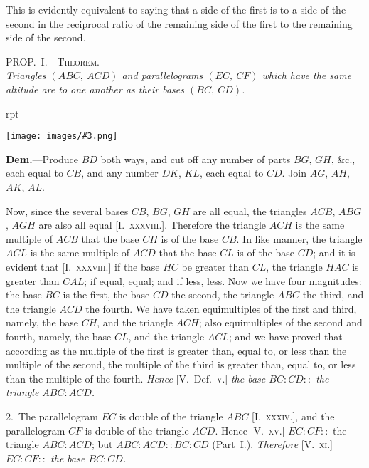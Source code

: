 \documentclass[oneside]{book}
\newcounter{wrapwidth}
\newcommand\myprop[2]{
\bigskip\Needspace*{4\baselineskip}\begin{center}\textsc{#1}\\\medskip\emph{#2}\par\end{center}
}
\newcommand\imgflow[3]{
\setcounter{wrapwidth}{#1}
\begin{wrapfigure}[#2]{r}{\value{wrapwidth}pt}
\begin{center}
\vspace{-0.3in}
\texttt{[image: images/\#3.png]}
\end{center}
\end{wrapfigure}
}
\begin{document}
\smallskip
\begin{footnotesize}
This is evidently equivalent to saying that a side of the first is
to a side of the second in the reciprocal ratio of the remaining
side of the first to the remaining side of the second.
\par\end{footnotesize}

\myprop{PROP\@.~I.---Theorem.}{Triangles $(ABC,\ ACD)$ and parallelograms $(EC,\ CF)$
which have the same altitude are to one another as their
bases $(BC,\ CD)$.}

\imgflow{190}{6}{f169}

\textbf{Dem.}---Produce $BD$ both ways, and cut off any number
of parts $BG$, $GH$,
\&c., each equal to
$CB$, and any number
$DK$, $KL$, each
equal to $CD$. Join
$AG$, $AH$, $AK$, $AL$.

Now, since the several bases $CB$, $BG$, $GH$ are all
equal, the triangles $ACB$, $ABG$, $AGH$ are also all equal
[I.~\textsc{xxxviii.}]. Therefore the triangle $ACH$ is the
same multiple of $ACB$ that the base $CH$ is of the base
$CB$. In like manner, the triangle $ACL$ is the same
multiple of $ACD$ that the base $CL$ is of the base $CD$;
and it is evident that [I.~\textsc{xxxviii.}] if the base $HC$ be
greater than $CL$, the triangle $HAC$ is greater than
$CAL$; if equal, equal; and if less, less. Now we
have four magnitudes: the base $BC$ is the first, the
base $CD$ the second, the triangle $ABC$ the third, and
the triangle $ACD$ the fourth. We have taken equimultiples
of the first and third, namely, the base
$CH$, and the triangle $ACH$; also equimultiples of the
second and fourth, namely, the base $CL$, and the triangle
$ACL$; and we have proved that according as the
multiple of the first is greater than, equal to, or less
than the multiple of the second, the multiple of the
third is greater than, equal to, or less than the multiple
of the fourth. \textit{Hence} [V.\ Def.~\textsc{v.}] \textit{the base
$BC : CD ::$  the triangle  $ABC : ACD$.}

2.~The parallelogram $EC$ is double of the triangle $ABC$
[I.~\textsc{xxxiv.}], and the parallelogram $CF$ is double of the
triangle $ACD$. Hence [V.~\textsc{xv.}] $EC : CF ::$ the triangle
$ABC : ACD$; but $ABC : ACD :: BC : CD$ (Part~I.).
\textit{Therefore} [V.~\textsc{xi.}] \textit{$EC : CF ::$ the base $BC : CD$.}
\end{document}
